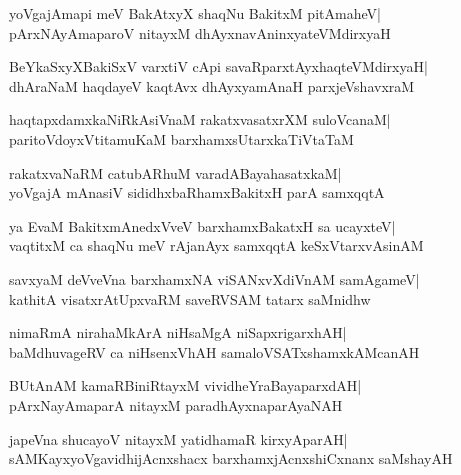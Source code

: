 \documentclass[twoside,12pt,openright]{book}
\newcounter{shloka}[chapter]
\begin{document}
\begin{shloka}%
yoVgajAmapi meV BakAtxyX shaqNu BakitxM pitAmaheV|\\
pArxNAyAmaparoV nitayxM dhAyxnavAninxyateVMdirxyaH
\end{shloka}

\begin{shloka}%
BeYkaSxyXBakiSxV varxtiV cApi savaRparxtAyxhaqteVMdirxyaH|\\
dhAraNaM haqdayeV kaqtAvx dhAyxyamAnaH parxjeVshavxraM
\end{shloka}

\begin{shloka}%
haqtapxdamxkaNiRkAsiVnaM rakatxvasatxrXM suloVcanaM|\\
paritoVdoyxVtitamuKaM barxhamxsUtarxkaTiVtaTaM
\end{shloka}

\begin{shloka}%
rakatxvaNaRM catubARhuM varadABayahasatxkaM|\\
yoVgajA mAnasiV sididhxbaRhamxBakitxH parA samxqqtA
\end{shloka}

\begin{shloka}%
ya EvaM BakitxmAnedxVveV barxhamxBakatxH sa ucayxteV|\\
vaqtitxM ca shaqNu meV rAjanAyx samxqqtA keSxVtarxvAsinAM
\end{shloka}

\begin{shloka}%
savxyaM deVveVna barxhamxNA viSANxvXdiVnAM samAgameV|\\
kathitA visatxrAtUpxvaRM saveRVSAM tatarx saMnidhw
\end{shloka}

\begin{shloka}%
nimaRmA nirahaMkArA niHsaMgA niSapxrigarxhAH|\\
baMdhuvageRV ca niHsenxVhAH samaloVSATxshamxkAMcanAH
\end{shloka}

\begin{shloka}%
BUtAnAM kamaRBiniRtayxM vividheYraBayaparxdAH|\\
pArxNayAmaparA nitayxM paradhAyxnaparAyaNAH
\end{shloka}

\begin{shloka}%
japeVna shucayoV nitayxM yatidhamaR kirxyAparAH|\\
sAMKayxyoVgavidhijAcnxshacx barxhamxjAcnxshiCxnanx saMshayAH
\end{shloka}
\end{document}
